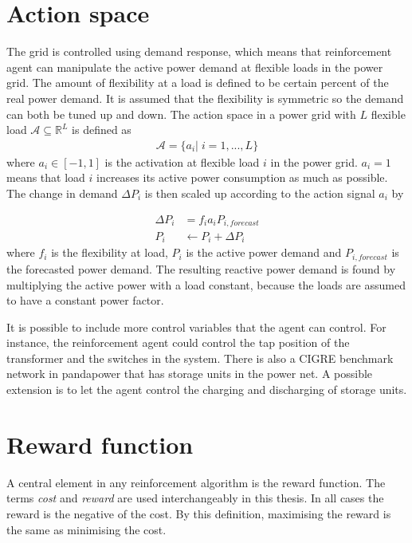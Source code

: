 \documentclass[class=book, crop=false]{standalone}
\begin{document}
\section{Action space}
The grid is controlled using demand response, which means that reinforcement agent can manipulate the active power demand at flexible loads in the power grid. The amount of flexibility at a load is defined to be certain percent of the real power demand. It is assumed that the flexibility is symmetric so the demand can both be tuned up and down. The action space in a power grid with $L$ flexible load  $\mathcal{A}  \subseteq \mathbb{R}^{L}$ is defined as
\begin{equation}
   \begin{aligned}
   \label{eq:problem:action_space}
\mathcal{A}= \{a_{i} | \;i = 1,...,L\}
    \end{aligned} 
\end{equation}
where $a_{i} \in [-1,1]$ is the activation at flexible load $i$ in the power grid. $a_{i} = 1$ means that load $i$ increases its active power consumption as much as possible. The change in demand $\Delta P_{i}$ is then scaled up according to the action signal $a_{i}$ by

\begin{equation}
   \begin{aligned}
   \label{eq:problem:update_demand}
    \Delta P_{i}& = f_{i}a_{i}P_{i,forecast} \\
    P_{i}& \leftarrow P_{i} + \Delta P_{i}
    \end{aligned} 
\end{equation}
where $f_{i}$ is the flexibility at load, $P_{i}$ is the active power demand and $P_{i,forecast}$ is the forecasted power demand. The resulting reactive power demand is found by multiplying the active power with a load constant, because the loads are assumed to have a constant power factor.

It is possible to include more control variables that the agent can control. For instance, the reinforcement agent could control the tap position of the transformer and the switches in the system. There is also a CIGRE benchmark network in pandapower that has storage units in the power net. A possible extension is to let the agent control the charging and discharging of storage units.

\section{Reward function}\label{section:reward}
A central element in any reinforcement algorithm is the reward function. The terms \textit{cost} and \textit{reward} are used interchangeably in this thesis. In all cases the reward is the negative of the cost. By this definition, maximising the reward is the same as minimising the cost. 
\end{document}
